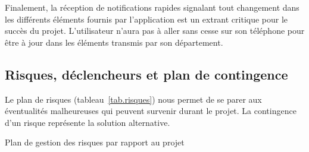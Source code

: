 	Finalement, la réception de notifications rapides signalant tout changement dans les différents éléments fournis par l’application est un extrant critique pour le succès du projet. L’utilisateur n'aura pas à aller sans cesse sur son téléphone pour être à jour dans les éléments transmis par son département.

	\subsection{Risques, déclencheurs et plan de contingence}
	Le plan de risques (tableau~\ref{tab.risques}) nous permet de se parer aux éventualités malheureuses qui peuvent survenir durant le projet. La contingence d'un risque représente la solution alternative.
	
	\begin{table}[hp]
		\centering
		
		\caption{Plan de gestion des risques par rapport au projet}
		\label{tab.risques}
	\end{table}